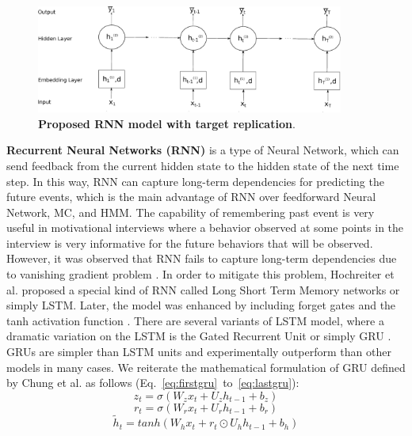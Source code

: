 \documentclass{amia_summit_2018}
\begin{document}
\begin{figure}[!htb]
    \centering
    \includegraphics[width=0.90\textwidth]{figures/rnn.eps}
    \caption{\textbf{Proposed RNN model with target replication}.}
    \label{fig:rnn-model}
\end{figure}

\textbf {Recurrent Neural Networks (RNN)} is a type of Neural Network, which can send feedback from the current hidden state to the hidden state of the next time step. In this way, RNN can capture long-term dependencies for predicting the future events, which is the main advantage of RNN over feedforward Neural Network, MC, and HMM. The capability of remembering past event is very useful in motivational interviews where a behavior observed at some points in the interview is very informative for the future behaviors that will be observed. However, it was observed that RNN fails to capture long-term dependencies due to vanishing gradient problem \cite{bengio1993problem}. In order to mitigate this problem, Hochreiter et al.\cite{hochreiter1997long} proposed a special kind of RNN called Long Short Term Memory networks or simply LSTM. Later, the model was enhanced by including forget gates and the tanh activation function \cite{graves2013speech}. There are several variants of LSTM model, where a dramatic variation on the LSTM is the Gated Recurrent Unit or simply GRU \cite{cho2014properties}. GRUs are simpler than LSTM units and experimentally outperform than other models in many cases. We reiterate the mathematical formulation of GRU defined by Chung et al.\cite{chung2014empirical} as follows (Eq.~\ref{eq:firstgru}~to~\ref{eq:lastgru}):
\begin{equation}
z_t = \sigma(W_zx_t + U_zh_{t-1} + b_z)
\label{eq:firstgru}
\end{equation}
\begin{equation}
r_t = \sigma(W_rx_t + U_rh_{t-1} + b_r)
\end{equation}
\begin{equation}
\tilde h_t = tanh(W_hx_t + r_t \odot U_hh_{t-1} + b_h) 
\end{equation}
\end{document}
